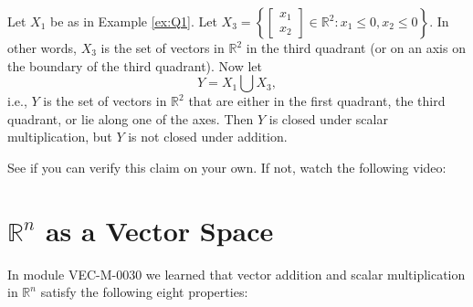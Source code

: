 \documentclass{ximera}
\newcommand{\RR}{\mathbb{R}}
\begin{document}
\begin{example}
\begin{explanation}
\begin{center}
\quad
{}
\end{center}
\end{explanation}
\end{example}

\begin{example} \label{ex:Q1-3}
Let $X_1$ be as in Example \ref{ex:Q1}.  Let $X_3=\left\{\begin{bmatrix} x_1\\x_2\end{bmatrix} \in \mathbb{R}^2 : x_1 \le 0, x_2 \le 0 \right\}$.
In other words, $X_3$ is the set of vectors in $\RR^2$ in the third quadrant (or on an axis on the boundary of the third quadrant).  Now let 
$$Y = X_1 \bigcup X_3,$$ 
i.e., $Y$ is the set of vectors in $\RR^2$ that are either in the first quadrant, the third quadrant, or lie along one of the axes.  Then $Y$ is closed under scalar multiplication, but $Y$ is not closed under addition.
\begin{explanation} See if you can verify this claim on your own.  If not, watch the following video:

\end{explanation}

\end{example}


 
\section*{$\RR^n$ as a Vector Space}

In module VEC-M-0030 we learned that vector addition and scalar multiplication in $\RR^n$ satisfy the following eight properties:
\end{document}
